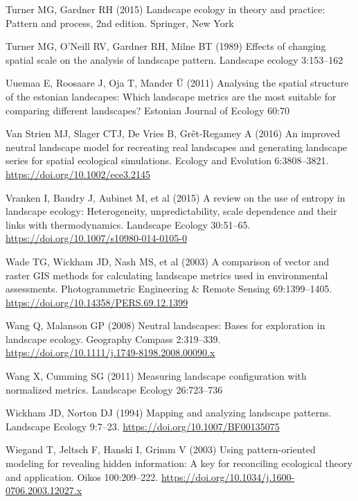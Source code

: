 \documentclass[
  10pt,
  a4paperpaper,
]{article}
\newlength{\cslhangindent}
\newenvironment{CSLReferences}[2] %
 {\begin{list}{}{%
  \setlength{\itemindent}{0pt}
  \setlength{\leftmargin}{0pt}
  \setlength{\parsep}{0pt}
  \ifodd #1
   \setlength{\leftmargin}{\cslhangindent}
   \setlength{\itemindent}{-1\cslhangindent}
  \fi
  \setlength{\itemsep}{#2\baselineskip}}}
 {\end{list}}
\begin{document}
\begin{CSLReferences}{1}{1}
Turner MG, Gardner RH (2015) Landscape ecology in theory and practice:
Pattern and process, 2nd edition. Springer, New York

Turner MG, O'Neill RV, Gardner RH, Milne BT (1989) Effects of changing
spatial scale on the analysis of landscape pattern. Landscape ecology
3:153--162

Uuemaa E, Roosaare J, Oja T, Mander Ü (2011) Analysing the spatial
structure of the estonian landscapes: Which landscape metrics are the
most suitable for comparing different landscapes? Estonian Journal of
Ecology 60:70

Van Strien MJ, Slager CTJ, De Vries B, Grêt-Regamey A (2016) An improved
neutral landscape model for recreating real landscapes and generating
landscape series for spatial ecological simulations. Ecology and
Evolution 6:3808--3821. \url{https://doi.org/10.1002/ece3.2145}

Vranken I, Baudry J, Aubinet M, et al (2015) A review on the use of
entropy in landscape ecology: Heterogeneity, unpredictability, scale
dependence and their links with thermodynamics. Landscape Ecology
30:51--65. \url{https://doi.org/10.1007/s10980-014-0105-0}

Wade TG, Wickham JD, Nash MS, et al (2003) A comparison of vector and
raster GIS methods for calculating landscape metrics used in
environmental assessments. Photogrammetric Engineering \& Remote Sensing
69:1399--1405. \url{https://doi.org/10.14358/PERS.69.12.1399}

Wang Q, Malanson GP (2008) Neutral landscapes: Bases for exploration in
landscape ecology. Geography Compass 2:319--339.
\url{https://doi.org/10.1111/j.1749-8198.2008.00090.x}

Wang X, Cumming SG (2011) Measuring landscape configuration with
normalized metrics. Landscape Ecology 26:723--736

Wickham JD, Norton DJ (1994) Mapping and analyzing landscape patterns.
Landscape Ecology 9:7--23. \url{https://doi.org/10.1007/BF00135075}

Wiegand T, Jeltsch F, Hanski I, Grimm V (2003) Using pattern-oriented
modeling for revealing hidden information: A key for reconciling
ecological theory and application. Oikos 100:209--222.
\url{https://doi.org/10.1034/j.1600-0706.2003.12027.x}


\end{CSLReferences}
\end{document}
